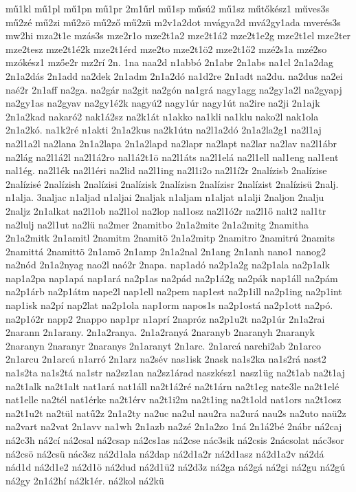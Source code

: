 {mű1kl
mű1pl
mű1pn
mű1pr
2m1űrl
mű1sp
műsú2
mű1sz
műtőkész1
műves3s
mű2zé
mű2zi
mű2zö
mű2ző
mű2zü
m2v1a2dot
mvágya2d
mvá2gy1ada
mverés3s
mw2hi
mza2t1e
mzás3s
mze2r1o
mze2t1a2
mze2t1á2
mze2t1e2g
mze2t1el
mze2ter
mze2tesz
mze2t1é2k
mze2t1érd
mze2to
mze2t1ö2
mze2t1ő2
mzé2s1a
mzé2so
mzókész1
mzőe2r
mz2rí
2n.
1na
naa2d
n1abbó
2n1abr
2n1abs
na1cl
2n1a2dag
2n1a2dás
2n1add
na2dek
2n1adm
2n1a2dó
na1d2re
2n1adt
na2du.
na2dus
na2ei
naé2r
2n1aff
na2ga.
na2gár
na2git
na2gón
na1grá
nagy1agg
na2gy1a2l
na2gyapj
na2gy1as
na2gyav
na2gy1é2k
nagyú2
nagy1úr
nagy1út
na2ire
na2ji
2n1ajk
2n1a2kad
nakaró2
nak1á2sz
na2k1át
n1akko
na1kli
na1klu
nako2l
nak1ola
2n1a2kó.
na1k2ré
n1akti
2n1a2kus
na2k1útn
na2l1a2dó
2n1a2la2g1
na2l1aj
na2l1a2l
na2lana
2n1a2lapa
2n1a2lapd
na2lapr
na2lapt
na2lar
na2lav
na2l1ábr
na2lág
na2l1á2l
na2l1á2ro
nal1á2t1ö
na2l1áts
na2l1elá
na2l1ell
nal1eng
nal1ent
nal1ég.
na2l1ék
na2l1éri
na2lid
na2l1ing
na2l1i2o
na2l1í2r
2nalízisb
2nalízise
2nalízisé
2nalízish
2nalízisi
2nalízisk
2nalízisn
2nalízisr
2nalízist
2nalízisü
2nalj.
n1alja.
3naljac
n1aljad
n1aljai
2naljak
n1aljam
n1aljat
n1alji
2naljon
2nalju
2naljz
2n1alkat
na2l1ob
na2l1ol
na2lop
nal1osz
na2l1ó2r
na2l1ő
nalt2
nal1tr
na2lulj
na2l1ut
na2lü
na2mer
2namitbo
2n1a2mite
2n1a2mitg
2namitha
2n1a2mitk
2n1amitl
2namitm
2namitö
2n1a2mitp
2namitro
2namitrú
2namits
2namittá
2namittö
2n1amö
2n1amp
2n1a2nal
2n1ang
2n1anh
nano1
nanog2
na2nód
2n1a2nyag
nao2l
naó2r
2napa.
nap1adó
na2p1a2g
na2p1ala
na2p1alk
nap1a2pa
nap1apá
nap1ará
na2p1as
na2pád
na2p1á2g
na2pák
nap1áll
na2pám
na2p1árb
na2p1átm
nape2l
nap1ell
na2pem
nap1est
na2p1ill
na2p1ing
na2p1int
nap1isk
na2pí
nap2lat
na2p1ola
nap1orm
napos1s
na2p1ostá
na2p1ott
na2pó.
na2p1ó2r
napp2
2nappo
nap1pr
n1aprí
2napróz
na2p1u2t
na2p1úr
2n1a2rai
2narann
2n1arany.
2n1a2ranya.
2n1a2ranyá
2naranyb
2naranyh
2naranyk
2naranyn
2naranyr
2naranys
2n1aranyt
2n1arc.
2n1arcá
narchi2ab
2n1arco
2n1arcu
2n1arcú
n1arró
2n1arz
na2sév
nas1isk
2nask
na1s2ka
na1s2rá
nast2
na1s2ta
na1s2tá
na1str
na2sz1an
na2sz1árad
naszkész1
nasz1üg
na2t1ab
na2t1aj
na2t1alk
na2t1alt
nat1ará
nat1áll
na2t1á2ré
na2t1árn
na2t1eg
nate3le
na2t1elé
nat1elle
na2tél
nat1érke
na2t1érv
na2t1i2m
na2t1ing
na2t1old
nat1ors
na2t1osz
na2t1u2t
na2tül
natű2z
2n1a2ty
na2uc
na2ul
nau2ra
na2urá
nau2s
na2uto
naü2z
na2vart
na2vat
2n1avv
na1wh
2n1azb
na2zé
2n1a2zo
1ná
2n1á2bé
2nábr
ná2caj
ná2c3h
ná2cí
ná2csal
ná2csap
ná2cs1as
ná2cse
nác3sik
ná2csis
2nácsolat
nác3sor
ná2csö
ná2csü
nác3sz
ná2d1ala
ná2dap
ná2d1a2r
ná2d1asz
ná2d1a2v
ná2dá
nád1d
ná2d1e2
ná2d1ö
ná2dud
ná2d1ü2
ná2d3z
ná2ga
ná2gá
ná2gi
ná2gu
ná2gú
ná2gy
2n1á2hí
ná2k1ér.
ná2kol
ná2kü
}
